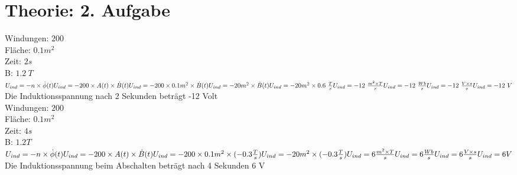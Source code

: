 \documentclass[a4paper, 12pt]{report}
\begin{document}
	\chapter{Theorie: 2. Aufgabe}
	Windungen: $200$ \\
	Fläche: $0.1m^2$ \\
	Zeit: $2s$ \\
	B: $1.2\ T$ \\
	$
	U_{ind} = -n \times \dot \phi (t) \\
	U_{ind} = -200 \times A(t) \times \dot B(t) \\
	U_{ind} = -200 \times 0.1m^2 \times \dot B(t) \\
	U_{ind} = -20m^2 \times \dot B(t) \\
	U_{ind} = -20m^2 \times 0.6\ \frac{T}{s} \\
	U_{ind} = -12\ \frac{m^2 \times T}{s} \\
	U_{ind} = -12\ \frac{Wb}{s} \\
	U_{ind} = -12\ \frac{V \times s}{s} \\
	U_{ind} = -12\ V \\
	$
	Die Induktionsspannung nach 2 Sekunden beträgt -12 Volt \\[1cm]
	Windungen: $200$ \\
	Fläche: $0.1m^2$ \\
	Zeit: $4s$ \\
	B: $1.2T$ \\
	$
	U_{ind} = -n \times \dot \phi (t) \\
	U_{ind} = -200 \times A(t) \times \dot B(t) \\
	U_{ind} = -200 \times 0.1m^2 \times (-0.3 \frac{T}{s}) \\
	U_{ind} = -20m^2 \times (-0.3 \frac{T}{s}) \\
	U_{ind} = 6 \frac{m^2 \times T}{s} \\
	U_{ind} = 6 \frac{Wb}{s} \\
	U_{ind} = 6 \frac{V \times s}{s} \\
	U_{ind} = 6 V \\
	$
	Die Induktionsspannung beim Abschalten beträgt nach 4 Sekunden 6 V
\end{document}
